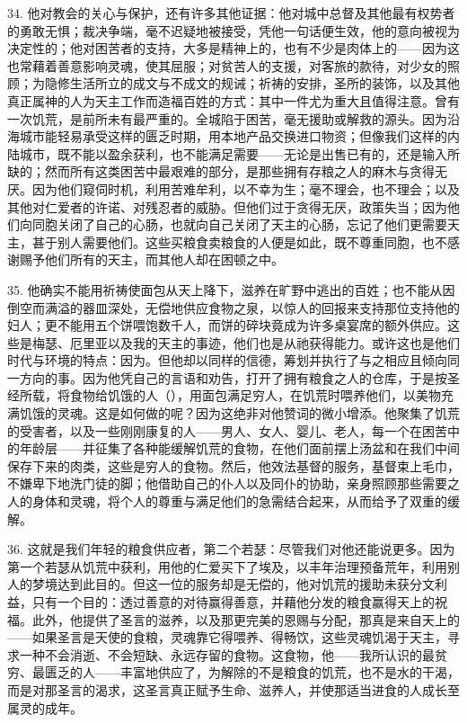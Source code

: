 34. 他对教会的关心与保护，还有许多其他证据：他对城中总督及其他最有权势者的勇敢无惧；裁决争端，毫不迟疑地被接受，凭他一句话便生效，他的意向被视为决定性的；他对困苦者的支持，大多是精神上的，也有不少是肉体上的——因为这也常藉着善意影响灵魂，使其屈服；对贫苦人的支援，对客旅的款待，对少女的照顾；为隐修生活所立的成文与不成文的规诫；祈祷的安排，圣所的装饰，以及其他真正属神的人为天主工作而造福百姓的方式：其中一件尤为重大且值得注意。曾有一次饥荒，是前所未有最严重的。全城陷于困苦，毫无援助或解救的源头。因为沿海城市能轻易承受这样的匮乏时期，用本地产品交换进口物资；但像我们这样的内陆城市，既不能以盈余获利，也不能满足需要——无论是出售已有的，还是输入所缺的；然而所有这类困苦中最艰难的部分，是那些拥有存粮之人的麻木与贪得无厌。因为他们窥伺时机，利用苦难牟利，以不幸为生；毫不理会，也不理会；以及其他对仁爱者的许诺、对残忍者的威胁。但他们过于贪得无厌，政策失当；因为他们向同胞关闭了自己的心肠，也就向自己关闭了天主的心肠，忘记了他们更需要天主，甚于别人需要他们。这些买粮食卖粮食的人便是如此，既不尊重同胞，也不感谢赐予他们所有的天主，而其他人却在困顿之中。\par

35. 他确实不能用祈祷使面包从天上降下，滋养在旷野中逃出的百姓；也不能从因倒空而满溢的器皿深处，无偿地供应食物之泉，以惊人的回报来支持那位支持他的妇人；更不能用五个饼喂饱数千人，而饼的碎块竟成为许多桌宴席的额外供应。这些是梅瑟、厄里亚以及我的天主的事迹，他们也是从祂获得能力。或许这也是他们时代与环境的特点：因为。但他却以同样的信德，筹划并执行了与之相应且倾向同一方向的事。因为他凭自己的言语和劝告，打开了拥有粮食之人的仓库，于是按圣经所载，将食物给饥饿的人（），用面包满足穷人，在饥荒时喂养他们，以美物充满饥饿的灵魂。这是如何做的呢？因为这绝非对他赞词的微小增添。他聚集了饥荒的受害者，以及一些刚刚康复的人——男人、女人、婴儿、老人，每一个在困苦中的年龄层——并征集了各种能缓解饥荒的食物，在他们面前摆上汤盆和在我们中间保存下来的肉类，这些是穷人的食物。然后，他效法基督的服务，基督束上毛巾，不嫌卑下地洗门徒的脚；他借助自己的仆人以及同仆的协助，亲身照顾那些需要之人的身体和灵魂，将个人的尊重与满足他们的急需结合起来，从而给予了双重的缓解。\par

36. 这就是我们年轻的粮食供应者，第二个若瑟：尽管我们对他还能说更多。因为第一个若瑟从饥荒中获利，用他的仁爱买下了埃及，以丰年治理预备荒年，利用别人的梦境达到此目的。但这一位的服务却是无偿的，他对饥荒的援助未获分文利益，只有一个目的：透过善意的对待赢得善意，并藉他分发的粮食赢得天上的祝福。此外，他提供了圣言的滋养，以及那更完美的恩赐与分配，那真是来自天上的——如果圣言是天使的食粮，灵魂靠它得喂养、得畅饮，这些灵魂饥渴于天主，寻求一种不会消逝、不会短缺、永远存留的食物。这食物，他——我所认识的最贫穷、最匮乏的人——丰富地供应了，为解除的不是粮食的饥荒，也不是水的干渴，而是对那圣言的渴求，这圣言真正赋予生命、滋养人，并使那适当进食的人成长至属灵的成年。\par

